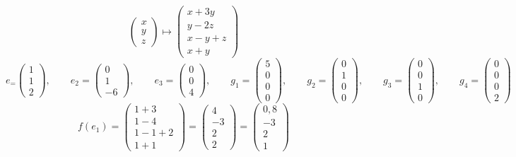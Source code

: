 $$
\begin{pmatrix}
	x \\
    y \\
    z
\end{pmatrix} \mapsto
\begin{pmatrix}
	x + 3y \\
    y - 2z \\
    x - y + z \\
    x + y
\end{pmatrix} $$
$$ e_ =
\begin{pmatrix}
	1 \\
    1 \\
    2
\end{pmatrix}, \qquad e_2 =
\begin{pmatrix}
	0 \\
    1 \\
    -6
\end{pmatrix}, \qquad e_3 =
\begin{pmatrix}
	0 \\
    0 \\
    4
\end{pmatrix}, \qquad g_1 =
\begin{pmatrix}
	5 \\
    0 \\
    0 \\
    0
\end{pmatrix}, \qquad g_2 =
\begin{pmatrix}
	0 \\
    1 \\
    0 \\
    0
\end{pmatrix}, \qquad g_3 =
\begin{pmatrix}
	0 \\
    0 \\
    1 \\
    0
\end{pmatrix}, \qquad g_4 =
\begin{pmatrix}
	0 \\
    0 \\
    0 \\
    2
\end{pmatrix} $$
$$ f(e_1) =
\begin{pmatrix}
    1 + 3 \\
    1 - 4 \\
    1 - 1 + 2 \\
    1 + 1
\end{pmatrix} =
\begin{pmatrix}
	4 \\
    -3 \\
    2 \\
    2
\end{pmatrix} =
\begin{pmatrix}
	0,8 \\
    -3 \\
    2 \\
    1
\end{pmatrix} $$
